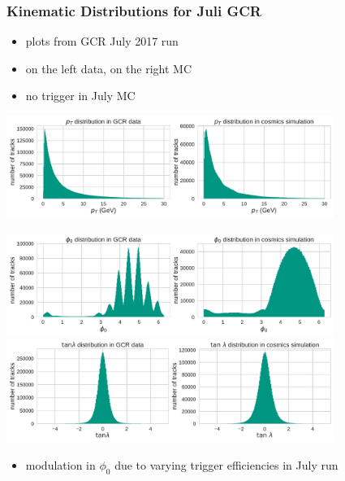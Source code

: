 \documentclass[18pt]{beamer}
\begin{document}
\begin{frame}
  \frametitle{Kinematic Distributions for Juli GCR}
  \begin{itemize}
    \item plots from GCR July 2017 run
    \item on the left data, on the right MC
    \item no trigger in July MC

    \end{itemize}
    \begin{center}
      \includegraphics[width=0.8\textwidth]{figures/distributions/gcr_pt_distribution_uncut.pdf}\\
    \end{center}
  \end{frame}

  \begin{frame}
    \begin{center}
      \includegraphics[width=0.8\textwidth]{figures/distributions/gcr_phi0_distribution_uncut.pdf}\\
      \includegraphics[width=0.8\textwidth]{figures/distributions/gcr_tan_lambda_distribution_uncut.pdf}
    \end{center}
    \begin{itemize}
    \item modulation in $\phi_0$ due to varying trigger efficiencies in July run
    \end{itemize}
  \end{frame}
\end{document}
